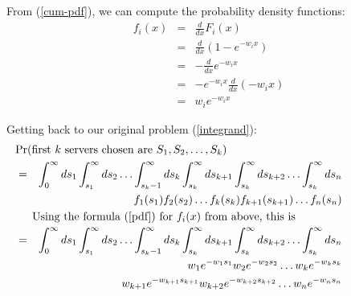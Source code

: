 From (\ref{cum-pdf}), we can compute the probability density functions:
\begin{eqnarray}
f_i(x) &=& \frac{d}{dx} F_i(x) \\ 
&=& \frac{d}{dx} ( 1 - e^{- w_i x} ) \nonumber \\
&=& - \frac{d}{dx} e^{- w_i x} \nonumber \\
&=& - e^{- w_i x} \frac{d}{dx} ( - w_i x ) \nonumber \\
&=& w_i e^{- w_i x} \label{pdf}
\end{eqnarray}

Getting back to our original problem (\ref{integrand}):
\begin{eqnarray}
\lefteqn{\Pr{first $k$ servers chosen are $S_1, S_2, \ldots, S_{k}$}} \nonumber \\
&=& \int_0^\infty ds_1
  \int_{s_1}^\infty ds_2 \ldots
  \int_{s_k-1}^\infty ds_k 
  \int_{s_k}^\infty ds_{k+1} \int_{s_k}^\infty ds_{k+2} \ldots
  \int_{s_k}^\infty ds_n \nonumber \\
&& f_1(s_1) f_2(s_2) \ldots f_k(s_k) f_{k+1}(s_{k+1}) \ldots f_n(s_n) \\
\noalign{Using the formula (\ref{pdf}) for $f_i(x)$ from above, this is}
&=& \int_0^\infty ds_1
  \int_{s_1}^\infty ds_2 \ldots
  \int_{s_k-1}^\infty ds_k 
  \int_{s_k}^\infty ds_{k+1} \int_{s_k}^\infty ds_{k+2} \ldots
  \int_{s_k}^\infty ds_n \nonumber \\
&& w_1 e^{- w_1 s_1} w_2 e^{- w_2 s_2} \ldots w_k e^{- w_k s_k} \nonumber \\
&& \ \ \ \   w_{k+1} e^{- w_{k+1} s_{k+1}} w_{k+2} e^{- w_{k+2} s_{k+2}} \ldots
  w_n e^{- w_n s_n}
\end{eqnarray}

